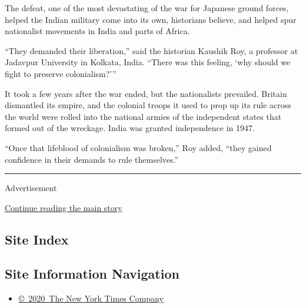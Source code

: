 The defeat, one of the most devastating of the war for Japanese ground
forces, helped the Indian military come into its own, historians
believe, and helped spur nationalist movements in India and parts of
Africa.

``They demanded their liberation,'' said the historian Kaushik Roy, a
professor at Jadavpur University in Kolkata, India. ``There was this
feeling, `why should we fight to preserve colonialism?'''

It took a few years after the war ended, but the nationalists prevailed.
Britain dismantled its empire, and the colonial troops it used to prop
up its rule across the world were rolled into the national armies of the
independent states that formed out of the wreckage. India was granted
independence in 1947.

``Once that lifeblood of colonialism was broken,'' Roy added, ``they
gained confidence in their demands to rule themselves.''

\begin{center}\rule{0.5\linewidth}{\linethickness}\end{center}

Advertisement

\protect\hyperlink{after-bottom}{Continue reading the main story}

\hypertarget{site-index}{%
\subsection{Site Index}\label{site-index}}

\hypertarget{site-information-navigation}{%
\subsection{Site Information
Navigation}\label{site-information-navigation}}

\begin{itemize}
\tightlist
\item
  \href{https://help.nytimes3xbfgragh.onion/hc/en-us/articles/115014792127-Copyright-notice}{©~2020~The
  New York Times Company}
\end{itemize}

